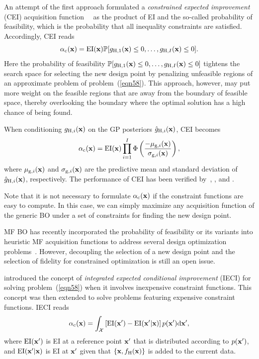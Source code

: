 \documentclass[journal ]{new-aiaa}
\begin{document}
	An attempt of the first approach formulated a \textit{constrained expected improvement} (CEI) acquisition function~~\citep{Schonlau1998} as the product of EI and the so-called probability of feasibility, which is the probability that all inequality constraints are satisfied.
	Accordingly, CEI reads
	\begin{equation}\label{eqn59}
		\alpha_\text{c}({\bf x}) = \text{EI}({\bf x}) \mathbb{P}[g_{\text{H},1}({\bf x}) \leq 0,\dots,g_{\text{H},I}({\bf x}) \leq 0].
	\end{equation}
	Here the probability of feasibility $\mathbb{P}[g_{\text{H},1}({\bf x}) \leq 0,\dots,g_{\text{H},I}({\bf x}) \leq 0]$ tightens the search space for selecting the new design point by penalizing unfeasible regions of an approximate problem of problem~(\ref{eqn58}).
	This approach, however, may put more weight on the feasible regions that are away from the boundary of feasible space, thereby overlooking the boundary where the optimal solution has a high chance of being found.
	
	When conditioning $g_{\text{H},i}({\bf x})$ on the GP posteriors $\hat{g}_{\text{H},i}({\bf x})$, CEI becomes
	\begin{equation}\label{eqn60}
		\alpha_\text{c}({\bf x}) = \text{EI}({\bf x}) \prod_{i=1}^I\Phi\left(\frac{-\mu_{\text{g},i}({\bf x})}{\sigma_{\text{g},i}({\bf x})}\right),
	\end{equation}
	where $\mu_{\text{g},i}({\bf x})$ and $\sigma_{\text{g},i}({\bf x})$ are the predictive mean and standard deviation of $\hat{g}_{\text{H},i}({\bf x})$, respectively.
	The performance of CEI has been verified by~\citet{Gardner2014}, \citet{Sobester2014}, and \citet{Kontogiannis2020b}.
	
	Note that it is not necessary to formulate $\alpha_\text{c}({\bf x})$ if the constraint functions are easy to compute.
	In this case, we can simply maximize any acquisition function of the generic BO under a set of constraints for finding the new design point.
	
	MF BO has recently incorporated the probability of feasibility or its variants into heuristic MF acquisition functions to address several design optimization problems~\citep[see e.g.,][]{Ghoreishi2019,Ruan2020,Ribeiro2023}.
	However, decoupling the selection of a new design point and the selection of fidelity for constrained optimization is still an open issue.
	
	\citet{Gramacy2011} introduced the concept of \textit{integrated expected conditional improvement} (IECI) for solving problem~(\ref{eqn58}) when it involves inexpensive constraint functions.
	This concept was then extended to solve problems featuring expensive constraint functions.
	IECI reads
	\begin{equation}\label{eqn61}
		\alpha_\text{c}({\bf x}) = \int_{\mathcal{X}} \left[\text{EI}({\bf x'}) - \text{EI}({\bf x'}|{\bf x})\right] p({\bf x'}) \text{d}{\bf x'},
	\end{equation}
	where $\text{EI}({\bf x'})$ is EI at a reference point $\bf x'$ that is distributed according to $p({\bf x'})$, and $\text{EI}({\bf x'}|{\bf x})$ is EI at $\bf x'$ given that $\{{\bf x},f_\text{H}({\bf x})\}$ is added to the current data.
	
\end{document}
